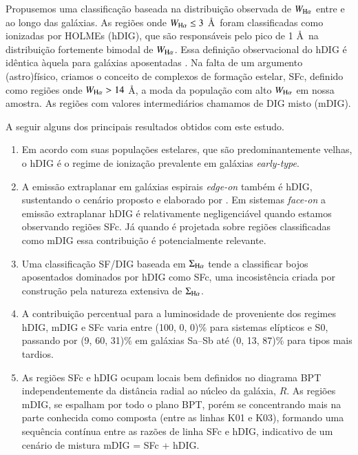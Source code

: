 Propusemos uma classificação baseada na distribuição observada de $W_{\Ha}$ entre e ao longo das galáxias. As regiões onde $W_{\Ha} \le 3$ \AA\ foram classificadas como ionizadas por HOLMEs (hDIG), que são responsáveis pelo pico de 1 \AA\ na distribuição fortemente bimodal de $W_{\Ha}$. Essa definição observacional do hDIG é idêntica àquela para galáxias aposentadas \citep{CidFernandes.etal.2011a}.
Na falta de um argumento (astro)físico, criamos o conceito de complexos de formação estelar, SFc, definido como regiões onde $W_{\Ha} > 14$ \AA, a moda da população com alto $W_{\Ha}$ em nossa amostra. As regiões com valores intermediários chamamos de DIG misto (mDIG).

A seguir alguns dos principais resultados obtidos com este estudo.

\begin{enumerate}[label=(\roman*)]
  \item Em acordo com suas populações estelares, que são predominantemente velhas, o hDIG é o regime de ionização prevalente em galáxias {\em early-type}.
  \item A emissão extraplanar em galáxias espirais {\em edge-on} também é hDIG, sustentando o cenário proposto e elaborado por \citet{FloresFajardo.etal.2011a}. Em sistemas {\em face-on} a emissão extraplanar hDIG é relativamente negligenciável quando estamos observando regiões SFc. Já quando é projetada sobre regiões classificadas como mDIG essa contribuição é potencialmente relevante.
  \item Uma classificação SF/DIG baseada em $\Sigma_{\Ha}$ tende a classificar bojos aposentados dominados por hDIG como SFc, uma incosistência criada por construção pela natureza extensiva de $\Sigma_{\Ha}$.
  \item A contribuição percentual para a luminosidade de \Ha proveniente dos regimes hDIG, mDIG e SFc varia entre (100, 0, 0)\% para sistemas elípticos e S0, passando por (9, 60, 31)\% em galáxias Sa--Sb até (0, 13, 87)\% para tipos mais tardios.
  \item As regiões SFc e hDIG ocupam locais bem definidos no diagrama BPT independentemente da distância radial ao núcleo da galáxia, $R$. As regiões mDIG, se espalham por todo o plano BPT, porém se concentrando mais na parte conhecida como composta (entre as linhas K01 e K03), formando uma sequência contínua entre as razões de linha SFc e hDIG, indicativo de um cenário de mistura mDIG = SFc + hDIG.
\end{enumerate}

